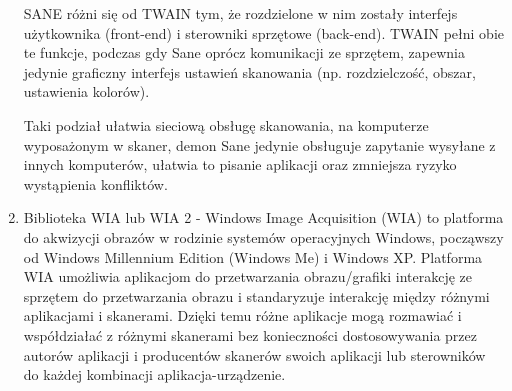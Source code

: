\documentclass[a4paper,12pt]{extarticle}  %
\begin{document}
\begin{enumerate}
	      SANE różni się od TWAIN tym, że rozdzielone w nim zostały interfejs użytkownika (front-end) i sterowniki sprzętowe (back-end). TWAIN pełni obie te funkcje, podczas gdy Sane oprócz komunikacji ze sprzętem, zapewnia jedynie graficzny interfejs ustawień skanowania (np. rozdzielczość, obszar, ustawienia kolorów).

	      Taki podział ułatwia sieciową obsługę skanowania, na komputerze wyposażonym w skaner, demon Sane jedynie obsługuje zapytanie wysyłane z innych komputerów, ułatwia to pisanie aplikacji oraz zmniejsza ryzyko wystąpienia konfliktów.
	\item Biblioteka WIA lub WIA 2 - Windows Image Acquisition (WIA) to platforma do akwizycji obrazów w rodzinie systemów operacyjnych Windows, począwszy od Windows Millennium Edition (Windows Me) i Windows XP.
	Platforma WIA umożliwia aplikacjom do przetwarzania obrazu/grafiki interakcję ze sprzętem do przetwarzania obrazu i standaryzuje interakcję między różnymi aplikacjami i skanerami. Dzięki temu różne aplikacje mogą rozmawiać i współdziałać z różnymi skanerami bez konieczności dostosowywania przez autorów aplikacji i producentów skanerów swoich aplikacji lub sterowników do każdej kombinacji aplikacja-urządzenie.

\end{enumerate}
\end{document}

